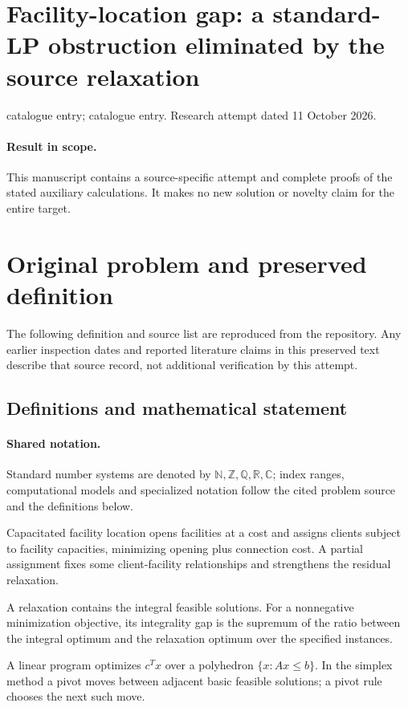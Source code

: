\documentclass[11pt]{article}
\begin{document}
\section*{Facility-location gap: a standard-LP obstruction eliminated by the source relaxation}
\noindent catalogue entry; catalogue entry. Research attempt dated 11 October 2026.
\paragraph{Result in scope.}This manuscript contains a source-specific attempt and complete proofs of the stated auxiliary calculations. It makes no new solution or novelty claim for the entire target.
\section{Original problem and preserved definition}
The following definition and source list are reproduced from the repository. Any earlier inspection dates and reported literature claims in this preserved text describe that source record, not additional verification by this attempt.
\subsection{Definitions and mathematical statement}

\paragraph{Shared notation.}Standard number systems are denoted by $\mathbb N,\mathbb Z,\mathbb Q,\mathbb R,\mathbb C$; index ranges, computational models and specialized notation follow the cited problem source and the definitions below.


Capacitated facility location opens facilities at a cost and assigns clients subject to facility capacities, minimizing opening plus connection cost. A partial assignment fixes some client-facility relationships and strengthens the residual relaxation.

A relaxation contains the integral feasible solutions. For a nonnegative minimization objective, its integrality gap is the supremum of the ratio between the integral optimum and the relaxation optimum over the specified instances.

A linear program optimizes $c^Tx$ over a polyhedron $\{x:Ax\leq b\}$. In the simplex method a pivot moves between adjacent basic feasible solutions; a pivot rule chooses the next such move.
\end{document}
